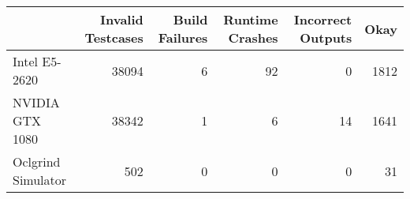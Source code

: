 \begin{tabular}{lrrrrr}
\toprule
{} &  Invalid Testcases &  Build Failures &  Runtime Crashes &  Incorrect Outputs &  Okay \\
\midrule
Intel E5-2620      &              38094 &               6 &               92 &                  0 &  1812 \\
NVIDIA GTX 1080    &              38342 &               1 &                6 &                 14 &  1641 \\
Oclgrind Simulator &                502 &               0 &                0 &                  0 &    31 \\
\bottomrule
\end{tabular}
